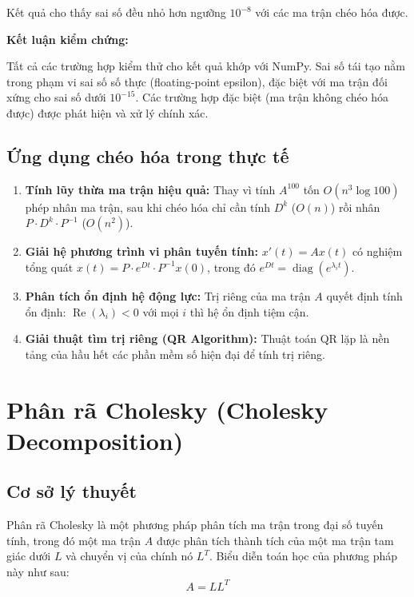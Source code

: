 \documentclass[a4paper,12pt]{report}
\begin{document}
Kết quả cho thấy sai số đều nhỏ hơn ngưỡng $10^{-8}$ với các ma trận chéo hóa được.

\medskip

\noindent\textbf{Kết luận kiểm chứng:}

Tất cả các trường hợp kiểm thử cho kết quả khớp với NumPy. Sai số tái tạo nằm trong phạm vi sai số số thực (floating-point epsilon), đặc biệt với ma trận đối xứng cho sai số dưới $10^{-15}$. Các trường hợp đặc biệt (ma trận không chéo hóa được) được phát hiện và xử lý chính xác.

\subsection{Ứng dụng chéo hóa trong thực tế}
\begin{enumerate}
  \item \textbf{Tính lũy thừa ma trận hiệu quả:} Thay vì tính $A^{100}$ tốn $O(n^3 \log 100)$ phép nhân ma trận, sau khi chéo hóa chỉ cần tính $D^k$ ($O(n)$) rồi nhân $P \cdot D^k \cdot P^{-1}$ ($O(n^2)$).
  
  \item \textbf{Giải hệ phương trình vi phân tuyến tính:} $x'(t) = A x(t)$ có nghiệm tổng quát $x(t) = P \cdot e^{Dt} \cdot P^{-1} x(0)$, trong đó $e^{Dt} = \operatorname{diag}(e^{\lambda_i t})$.
  
  \item \textbf{Phân tích ổn định hệ động lực:} Trị riêng của ma trận $A$ quyết định tính ổn định: $\operatorname{Re}(\lambda_i) < 0$ với mọi $i$ thì hệ ổn định tiệm cận.
  
  \item \textbf{Giải thuật tìm trị riêng (QR Algorithm):} Thuật toán QR lặp là nền tảng của hầu hết các phần mềm số hiện đại để tính trị riêng.
\end{enumerate}


\section{Phân rã Cholesky (Cholesky Decomposition)}

\subsection{Cơ sở lý thuyết}
Phân rã Cholesky là một phương pháp phân tích ma trận trong đại số tuyến tính, trong đó một ma trận $A$ được phân tích thành tích của một ma trận tam giác dưới $L$ và chuyển vị của chính nó $L^T$. Biểu diễn toán học của phương pháp này như sau:
\[
  A = LL^T
\]
\end{document}

